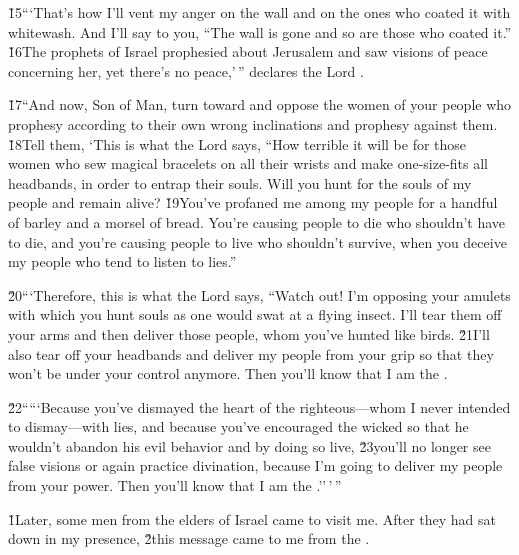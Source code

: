 \v{15}```That's how I'll vent my anger on the wall and on the ones who coated it with whitewash. And I'll say to you, ``The wall is gone and so are those who coated it.'' \v{16}The prophets of Israel prophesied about Jerusalem and saw visions of peace concerning her, yet there's no peace,'\,'' declares the Lord .

\v{17}``And now, Son of Man, turn toward and oppose the women of your people who prophesy according to their own wrong inclinations and prophesy against them. \v{18}Tell them, `This is what the Lord  says, ``How terrible it will be for those women who sew magical bracelets on all their wrists and make one-size-fits all headbands, in order to entrap their souls. Will you hunt for the souls of my people and remain alive? \v{19}You've profaned me among my people for a handful of barley and a morsel of bread. You're causing people to die who shouldn't have to die, and you're causing people to live who shouldn't survive, when you deceive my people who tend to listen to lies.''

\v{20}```Therefore, this is what the Lord  says, ``Watch out! I'm opposing your amulets with which you hunt souls as one would swat at a flying insect. I'll tear them off your arms and then deliver those people, whom you've hunted like birds. \v{21}I'll also tear off your headbands and deliver my people from your grip so that they won't be under your control anymore. Then you'll know that I am the .

\v{22}`````Because you've dismayed the heart of the righteous---whom I never intended to dismay---with lies, and because you've encouraged the wicked so that he wouldn't abandon his evil behavior and by doing so live, \v{23}you'll no longer see false visions or again practice divination, because I'm going to deliver my people from your power. Then you'll know that I am the .''\,'\,''

\v{1}Later, some men from the elders of Israel came to visit me. After they had sat down in my presence, \v{2}this message came to me from the .

